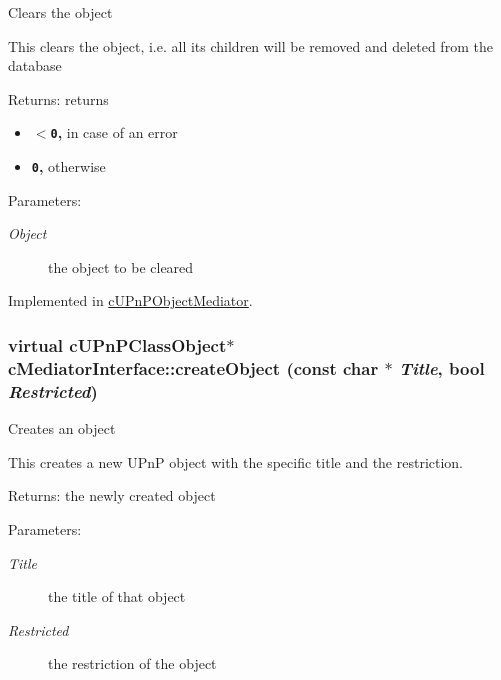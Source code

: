 Clears the object

This clears the object, i.e. all its children will be removed and deleted from the database

\begin{Desc}
\item[Returns:]returns\begin{itemize}
\item {\bf {\tt $<$0},} in case of an error\item {\bf {\tt 0},} otherwise \end{itemize}
\end{Desc}
\begin{Desc}
\item[Parameters:]
\begin{description}
\item[{\em Object}]the object to be cleared \end{description}
\end{Desc}


Implemented in \hyperlink{classcUPnPObjectMediator_9ab720e86c6d6cb397799ac5070f70aa}{cUPnPObjectMediator}.\hypertarget{classcMediatorInterface_68a8350f7ea5ccd2496580035228b1fc}{
\subsubsection[{createObject}]{\setlength{\rightskip}{0pt plus 5cm}virtual {\bf cUPnPClassObject}$\ast$ cMediatorInterface::createObject (const char $\ast$ {\em Title}, \/  bool {\em Restricted})}}
\label{classcMediatorInterface_68a8350f7ea5ccd2496580035228b1fc}


Creates an object

This creates a new UPnP object with the specific title and the restriction.

\begin{Desc}
\item[Returns:]the newly created object \end{Desc}
\begin{Desc}
\item[Parameters:]
\begin{description}
\item[{\em Title}]the title of that object \item[{\em Restricted}]the restriction of the object \end{description}
\end{Desc}


